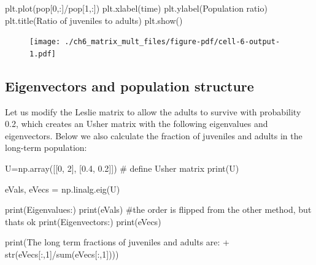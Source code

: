 \documentclass[
  letterpaper,
  DIV=11,
  numbers=noendperiod]{scrreprt}
\newenvironment{Shaded}{\begin{snugshade}}{\end{snugshade}}
\newcommand{\BuiltInTok}[1]{\textcolor[rgb]{0.00,0.23,0.31}{#1}}
\newcommand{\CommentTok}[1]{\textcolor[rgb]{0.37,0.37,0.37}{#1}}
\newcommand{\DecValTok}[1]{\textcolor[rgb]{0.68,0.00,0.00}{#1}}
\newcommand{\FloatTok}[1]{\textcolor[rgb]{0.68,0.00,0.00}{#1}}
\newcommand{\NormalTok}[1]{\textcolor[rgb]{0.00,0.23,0.31}{#1}}
\newcommand{\OperatorTok}[1]{\textcolor[rgb]{0.37,0.37,0.37}{#1}}
\newcommand{\StringTok}[1]{\textcolor[rgb]{0.13,0.47,0.30}{#1}}
\begin{document}
\begin{Shaded}
\begin{Highlighting}[]
\NormalTok{plt.plot(pop[}\DecValTok{0}\NormalTok{,:]}\OperatorTok{/}\NormalTok{pop[}\DecValTok{1}\NormalTok{,:])}
\NormalTok{plt.xlabel(}\StringTok{\textquotesingle{}time\textquotesingle{}}\NormalTok{)}
\NormalTok{plt.ylabel(}\StringTok{\textquotesingle{}Population ratio\textquotesingle{}}\NormalTok{)}
\NormalTok{plt.title(}\StringTok{\textquotesingle{}Ratio of juveniles to adults\textquotesingle{}}\NormalTok{)}
\NormalTok{plt.show()}
\end{Highlighting}
\end{Shaded}

\begin{figure}[H]

{\centering \texttt{[image: ./ch6\_matrix\_mult\_files/figure-pdf/cell-6-output-1.pdf]}

}

\end{figure}

\hypertarget{eigenvectors-and-population-structure}{%
\subsection{Eigenvectors and population
structure}\label{eigenvectors-and-population-structure}}

Let us modify the Leslie matrix to allow the adults to survive with
probability 0.2, which creates an Usher matrix with the following
eigenvalues and eigenvectors. Below we also calculate the fraction of
juveniles and adults in the long-term population:

\begin{Shaded}
\begin{Highlighting}[]
\NormalTok{U}\OperatorTok{=}\NormalTok{np.array([[}\DecValTok{0}\NormalTok{, }\DecValTok{2}\NormalTok{], [}\FloatTok{0.4}\NormalTok{, }\FloatTok{0.2}\NormalTok{]]) }\CommentTok{\# define Usher matrix}
\BuiltInTok{print}\NormalTok{(U)}

\NormalTok{eVals, eVecs }\OperatorTok{=}\NormalTok{ np.linalg.eig(U)}

\BuiltInTok{print}\NormalTok{(}\StringTok{\textquotesingle{}Eigenvalues:\textquotesingle{}}\NormalTok{)}
\BuiltInTok{print}\NormalTok{(eVals) }\CommentTok{\#the order is flipped from the other method, but that\textquotesingle{}s ok}
\BuiltInTok{print}\NormalTok{(}\StringTok{\textquotesingle{}Eigenvectors:\textquotesingle{}}\NormalTok{)}
\BuiltInTok{print}\NormalTok{(eVecs)}

\BuiltInTok{print}\NormalTok{(}\StringTok{\textquotesingle{}The long term fractions of juveniles and adults are: \textquotesingle{}} \OperatorTok{+} \BuiltInTok{str}\NormalTok{(eVecs[:,}\DecValTok{1}\NormalTok{]}\OperatorTok{/}\BuiltInTok{sum}\NormalTok{(eVecs[:,}\DecValTok{1}\NormalTok{])))}
\end{Highlighting}
\end{Shaded}
\end{document}
